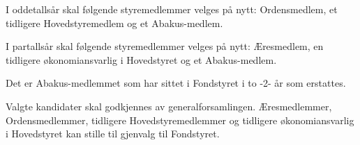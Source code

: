 I oddetallsår skal følgende styremedlemmer velges på nytt: Ordensmedlem, et tidligere
Hovedstyremedlem og et Abakus-medlem.

I partallsår skal følgende styremedlemmer velges på nytt: Æresmedlem, en tidligere
økonomiansvarlig i Hovedstyret og et Abakus-medlem.

Det er Abakus-medlemmet som har sittet i Fondstyret i to -2- år som erstattes.

Valgte kandidater skal godkjennes av generalforsamlingen. Æresmedlemmer, Ordensmedlemmer,
tidligere Hovedstyremedlemmer og tidligere økonomiansvarlig i Hovedstyret kan
stille til gjenvalg til Fondstyret.
